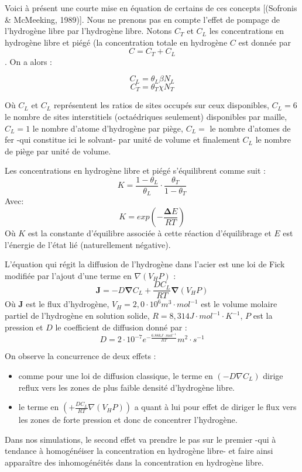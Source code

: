 \documentclass[a4paper, french, 11pt, draft]{article}
\begin{document}
    Voici à présent une courte mise en équation de certains de ces concepts [(Sofronis \& McMeeking, 1989)]. 
    Nous ne prenons pas en compte l'effet de pompage de l'hydrogène libre par l'hydrogène libre.
    Notons \(C_{T}\) et \(C_{L}\) les concentrations en hydrogène libre et piégé (la concentration totale en hydrogène \(C\) est donnée par \[C = C_{T} + C_{L}\].
    On a alors : 

    \[C_{L} = \theta_{L} \beta N_{L}\]
    \[C_{T} = \theta_{T} \chi N_{T}\]

    Où \(C_{L}\) et \(C_{L}\) représentent les ratios de sites occupés sur ceux disponibles, \(C_{L} = 6\) le nombre de sites interstitiels (octaédriques seulement) disponibles par maille, \(C_{L} = 1\) le nombre d'atome d'hydrogène par piège, \(C_{L} = \) le nombre d'atomes de fer -qui constitue ici le solvant- par unité de volume et finalement \(C_{L}\) le nombre de piège par unité de volume.

    Les concentrations en hydrogène libre et piégé s'équilibrent comme suit : 
    \[K = \frac{1 - \theta_{L}}{\theta_{L}} \cdot \frac{\theta_{T}}{1-\theta_{T}}\]
    Avec:
    \[K = exp(-\frac{\boldsymbol{\Delta}E}{RT})\]
    Où  \(K\) est la constante d'équilibre associée à cette réaction d'équilibrage et \(E\) est l'énergie de l'état lié (naturellement négative). 

    
    L'équation qui régit la diffusion de l'hydrogène dans l'acier est une loi de Fick modifiée par l'ajout d'une terme en \(\nabla(V_{H}P)\) :
    \[\textbf{J}=-D\boldsymbol{\nabla}C_{L}+\frac{DC_{L}}{RT}\boldsymbol{\nabla}(V_{H}P)\]
    Où \(\textbf{J}\) est le flux d'hydrogène, \(V_{H} = 2,0 \cdot 10^{6} m^{3} \cdot mol^{-1}\) est le volume molaire partiel de l'hydrogène en solution solide, \(R = 8,314 J \cdot mol^{-1} \cdot K^{-1} \), \(P\) est la pression et \(D\) le coefficient de diffusion donné par : 
    \[D = 2 \cdot 10^{-7} e^{- 	\frac{6.88kJ \cdot mol^{-1} }{RT}	}m^{2} 		\cdot s^{-1} \]    

    On observe la concurrence de deux effets :
    \begin{itemize}
        \item comme pour une loi de diffusion classique, le terme en \((-D \nabla C_{L})\) dirige reflux vers les zones de plus faible densité d'hydrogène libre.
        \item le terme en \((+ \frac{D C_{L}}{RT} \nabla(V_{H}P))\) a quant à lui pour effet de diriger le flux vers les zones de forte pression et donc de concentrer l'hydrogène.
    \end{itemize}
    Dans nos simulations, le second effet va prendre le pas sur le premier -qui à tendance à homogénéiser la concentration en hydrogène libre- et faire ainsi apparaître des inhomogénéités dans la concentration en hydrogène libre.
\end{document}
